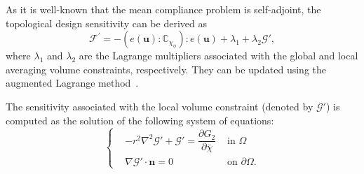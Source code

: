 \begin{subappendices}
As it is well-known that the mean compliance problem is self-adjoint, the topological design sensitivity can be derived as
\begin{equation}
	\mathcal{F}^{\prime}=-\left(e(\boldsymbol{u}): \mathbb{C}_{\chi_{\phi}}\right): e(\boldsymbol{u})+\lambda_{1} + \lambda_2 \mathcal{G}',
	\label{Eq: design sensitivity}
\end{equation}
where $\lambda_{1}$ and $\lambda_{2}$ are the Lagrange multipliers associated with the global and local averaging volume constraints, respectively. They can be updated using the augmented Lagrange method\ \cite{li2021full}.

The sensitivity associated with the local volume constraint (denoted by $\mathcal{G}'$) is computed as the solution of the following system of equations:
\begin{equation}
	\left\{\begin{aligned}
		& -r^2 \nabla^2 \mathcal{G}' +  \mathcal{G}' =  \dfrac{\partial G_2}{\partial \bar{\chi}} & \text{ in } \Omega \\
		& \nabla\mathcal{G}' \cdot \boldsymbol{n} = 0 & \text{ on } \partial \Omega.
	\end{aligned}\right.
	\label{Eq: G'}
\end{equation}


\end{subappendices}




\cleardoublepage
